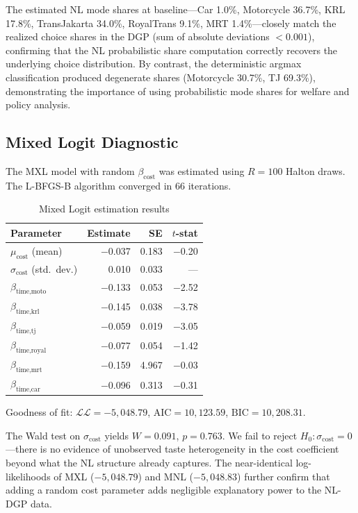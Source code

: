 \documentclass[12pt,a4paper]{article}
\begin{document}
The estimated NL mode shares at baseline---Car 1.0\%, Motorcycle 36.7\%, KRL 17.8\%, TransJakarta 34.0\%, RoyalTrans 9.1\%, MRT 1.4\%---closely match the realized choice shares in the DGP (sum of absolute deviations $< 0.001$), confirming that the NL probabilistic share computation correctly recovers the underlying choice distribution. By contrast, the deterministic argmax classification produced degenerate shares (Motorcycle 30.7\%, TJ 69.3\%), demonstrating the importance of using probabilistic mode shares for welfare and policy analysis.

\subsection{Mixed Logit Diagnostic}

The MXL model with random $\beta_{\text{cost}}$ was estimated using $R = 100$ Halton draws. The L-BFGS-B algorithm converged in 66 iterations.

\begin{table}[ht]
\centering
\caption{Mixed Logit estimation results}
\label{tab:mxl}
\begin{tabular}{lrrr}
\toprule
Parameter & Estimate & SE & $t$-stat \\
\midrule
$\mu_{\text{cost}}$ (mean)  & $-$0.037 & 0.183  & $-$0.20 \\
$\sigma_{\text{cost}}$ (std.\ dev.) & 0.010  & 0.033  & --- \\
$\beta_{\text{time,moto}}$  & $-$0.133 & 0.053  & $-$2.52 \\
$\beta_{\text{time,krl}}$   & $-$0.145 & 0.038  & $-$3.78 \\
$\beta_{\text{time,tj}}$    & $-$0.059 & 0.019  & $-$3.05 \\
$\beta_{\text{time,royal}}$ & $-$0.077 & 0.054  & $-$1.42 \\
$\beta_{\text{time,mrt}}$   & $-$0.159 & 4.967  & $-$0.03 \\
$\beta_{\text{time,car}}$    & $-$0.096 & 0.313  & $-$0.31 \\
\bottomrule
\end{tabular}
\end{table}

Goodness of fit: $\mathcal{L}\mathcal{L} = -5{,}048.79$, $\text{AIC} = 10{,}123.59$, $\text{BIC} = 10{,}208.31$.

The Wald test on $\sigma_{\text{cost}}$ yields $W = 0.091$, $p = 0.763$. We fail to reject $H_0: \sigma_{\text{cost}} = 0$---there is no evidence of unobserved taste heterogeneity in the cost coefficient beyond what the NL structure already captures. The near-identical log-likelihoods of MXL ($-5{,}048.79$) and MNL ($-5{,}048.83$) further confirm that adding a random cost parameter adds negligible explanatory power to the NL-DGP data.
\end{document}
